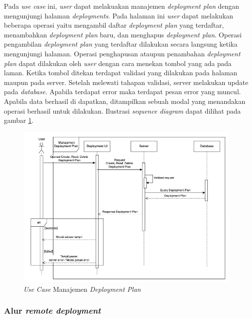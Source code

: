 Pada \textit{use case} ini, \textit{user} dapat melakuakan manajemen \textit{deployment plan} dengan mengunjungi halaman \textit{deployments}. Pada halaman ini \textit{user} dapat melakukan beberapa operasi yaitu mengambil daftar \textit{deployment plan} yang terdaftar, menambahkan \textit{deployment plan} baru, dan menghapus \textit{deployment plan}. Operasi pengambilan \textit{deployment plan} yang terdaftar dilakukan secara langsung ketika mengunjungi halaman. Operasi penghapusan ataupun penambahan \textit{deployment plan} dapat dilakukan oleh \textit{user} dengan cara menekan tombol yang ada pada laman. Ketika tombol ditekan terdapat validasi yang dilakukan pada halaman maupun pada server. Setelah melewati tahapan validasi, server melakukan update pada \textit{database}. Apabila terdapat error maka terdapat pesan error yang muncul. Apabila data berhasil di dapatkan, ditampilkan sebuah modal yang menandakan operasi berhasil untuk dilakukan. Ilustrasi \textit{sequence diagram} dapat dilihat pada gambar \ref{fig:usecase-11}.


\begin{figure}[ht]
  \centering
  \includegraphics[width=1\textwidth]{resources/chapter-3/usecase/uc-11.jpg}
  \caption{\textit{Use Case} Manajemen \textit{Deployment Plan}}
  \label{fig:usecase-11}
\end{figure}

\pagebreak

\subsubsection{Alur \textit{remote deployment}}

